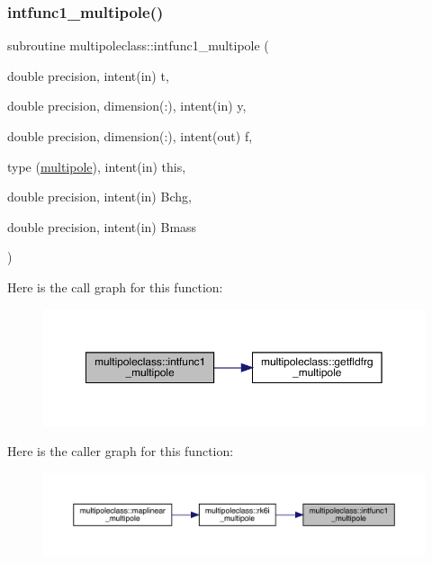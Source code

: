 \subsubsection{\texorpdfstring{intfunc1\_multipole()}{intfunc1\_multipole()}}
{\footnotesize\ttfamily subroutine multipoleclass\+::intfunc1\+\_\+multipole (\begin{DoxyParamCaption}\item[{double precision, intent(in)}]{t,  }\item[{double precision, dimension(\+:), intent(in)}]{y,  }\item[{double precision, dimension(\+:), intent(out)}]{f,  }\item[{type (\mbox{\hyperlink{namespacemultipoleclass_structmultipoleclass_1_1multipole}{multipole}}), intent(in)}]{this,  }\item[{double precision, intent(in)}]{Bchg,  }\item[{double precision, intent(in)}]{Bmass }\end{DoxyParamCaption})}

Here is the call graph for this function\+:\nopagebreak
\begin{figure}[H]
\begin{center}
\leavevmode
\includegraphics[width=350pt]{namespacemultipoleclass_adba27354e821268f6cb786c415a5bc91_cgraph}
\end{center}
\end{figure}
Here is the caller graph for this function\+:\nopagebreak
\begin{figure}[H]
\begin{center}
\leavevmode
\includegraphics[width=350pt]{namespacemultipoleclass_adba27354e821268f6cb786c415a5bc91_icgraph}
\end{center}
\end{figure}
\mbox{\label{namespacemultipoleclass_ab9ed6db5fa3b4ea0f6e1a07cd6d57431}} 
